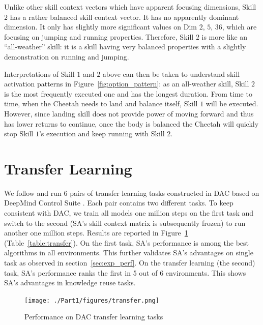 Unlike other skill context vectors which have apparent focusing
dimensions, Skill $2$ has a rather balanced skill context vector.
It has no apparently dominant dimension. It only has slightly
more significant values on Dim $2$, $5$, $36$, which are focusing
on jumping and running properties. Therefore, Skill $2$ is more
like an ``all-weather'' skill: it is a skill having very balanced
properties with a slightly demonstration on running and jumping.

Interpretations of Skill $1$ and $2$ above can then be taken to
understand skill activation patterns in
Figure~\ref{fig:option_pattern}: as an all-weather skill, Skill
$2$ is the most frequently executed one and has the longest
duration. From time to time, when the Cheetah needs to land and
balance itself, Skill $1$ will be executed. However, since
landing skill does not provide power of moving forward and thus
has lower returns to continue, once the body is balanced the
Cheetah will quickly stop Skill $1$'s execution and keep running
with Skill $2$.


\section{Transfer Learning}
\label{sec:transfer}

We follow  and run 6 pairs of transfer
learning tasks constructed in DAC based on DeepMind Control Suite
\cite{tassa2020dmcontrol}. Each pair contains two different
tasks. To keep consistent with DAC, we train all models one
million steps on the first task and switch to the second (SA's
skill context matrix is subsequently frozen) to run another one
million steps. Results are reported in Figure~\ref{fig:transfer}
(Table~\ref{table:transfer}). On the first task, SA's
performance is among the best algorithms in all environments.
This further validates SA's advantages on single task as observed
in section~\ref{sec:exp_perf}. On the transfer learning (the
second) task, SA's performance ranks the first in 5 out of 6
environments. This shows SA's advantages in knowledge reuse
tasks.
\begin{figure}[h]
  \vspace{-2mm}
  \centering
  \texttt{[image: ./Part1/figures/transfer.png]}\\
  \vspace{-4mm}
  \caption{\label{fig:transfer} Performance on DAC transfer
    learning tasks}
  \vspace{-4mm}
\end{figure}

